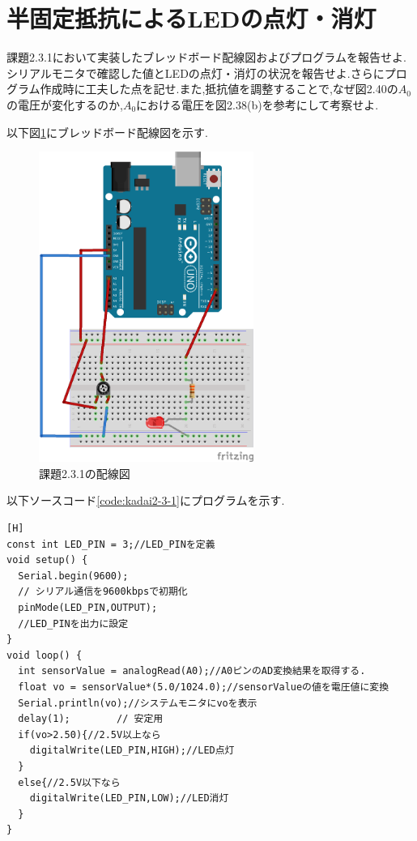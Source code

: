 \documentclass{jarticle}
\begin{document}
\section{半固定抵抗によるLEDの点灯・消灯}
課題2.3.1において実装したブレッドボード配線図およびプログラムを報告せよ.シリアルモニタで確認した値とLEDの点灯・消灯の状況を報告せよ.さらにプログラム作成時に工夫した点を記せ.また,抵抗値を調整することで,なぜ図2.40の$A_0$の電圧が変化するのか,$A_0$における電圧を図2.38(b)を参考にして考察せよ.

以下図\ref{fig:kadai2-3-1bread}にブレッドボード配線図を示す.

\begin{figure}[H]
\begin{center}
\includegraphics[width=7.0cm]{images/kadai2-3-1_bread.png}
\caption{課題2.3.1の配線図}
\label{fig:kadai2-3-1bread}
\end{center}
\end{figure}

以下ソースコード\ref{code:kadai2-3-1}にプログラムを示す.


\begin{lstlisting}[caption = 課題2.3.1,label=code:kadai2-3-1][H]
const int LED_PIN = 3;//LED_PINを定義
void setup() {
  Serial.begin(9600);
  // シリアル通信を9600kbpsで初期化
  pinMode(LED_PIN,OUTPUT);
  //LED_PINを出力に設定
}
void loop() {
  int sensorValue = analogRead(A0);//A0ピンのAD変換結果を取得する.
  float vo = sensorValue*(5.0/1024.0);//sensorValueの値を電圧値に変換
  Serial.println(vo);//システムモニタにvoを表示
  delay(1);        // 安定用
  if(vo>2.50){//2.5V以上なら
    digitalWrite(LED_PIN,HIGH);//LED点灯
  }
  else{//2.5V以下なら
    digitalWrite(LED_PIN,LOW);//LED消灯
  } 
}
\end{lstlisting}
\end{document}

